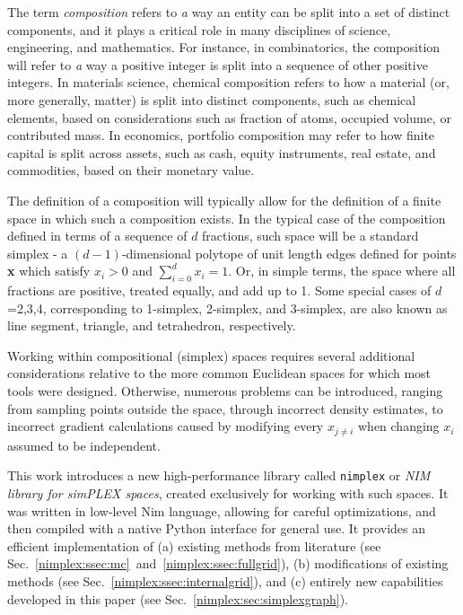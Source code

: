 The term \emph{composition} refers to \emph{a} way an entity can be split into a set of distinct components, and it plays a critical role in many disciplines of science, engineering, and mathematics. For instance, in combinatorics, the composition will refer to \emph{a} way a positive integer is split into a sequence of other positive integers. In materials science, chemical composition refers to how a material (or, more generally, matter) is split into distinct components, such as chemical elements, based on considerations such as fraction of atoms, occupied volume, or contributed mass. In economics, portfolio composition may refer to how finite capital is split across assets, such as cash, equity instruments, real estate, and commodities, based on their monetary value.

The definition of a composition will typically allow for the definition of a finite space in which such a composition exists. In the typical case of the composition defined in terms of a sequence of $d$ fractions, such space will be a standard simplex - a $(d-1)$-dimensional polytope of unit length edges defined for points \textbf{x} which satisfy $x_i>0$ and $\sum_{i=0}^d x_i = 1$. Or, in simple terms, the space where all fractions are positive, treated equally, and add up to 1. Some special cases of $d$=2,3,4, corresponding to 1-simplex, 2-simplex, and 3-simplex, are also known as line segment, triangle, and tetrahedron, respectively.

Working within compositional (simplex) spaces requires several additional considerations relative to the more common Euclidean spaces for which most tools were designed. Otherwise, numerous problems can be introduced, ranging from sampling points outside the space, through incorrect density estimates, to incorrect gradient calculations caused by modifying every $x_{j\neq i}$ when changing $x_i$ assumed to be independent.

This work introduces a new high-performance library called \texttt{nimplex} or \textit{NIM library for simPLEX spaces}, created exclusively for working with such spaces. It was written in low-level Nim language, allowing for careful optimizations, and then compiled with a native Python interface for general use. It provides an efficient implementation of (a) existing methods from literature (see Sec.~\ref{nimplex:ssec:mc}~and~\ref{nimplex:ssec:fullgrid}), (b) modifications of existing methods (see Sec.~\ref{nimplex:ssec:internalgrid}), and (c) entirely new capabilities developed in this paper (see Sec.~\ref{nimplex:sec:simplexgraph}).

